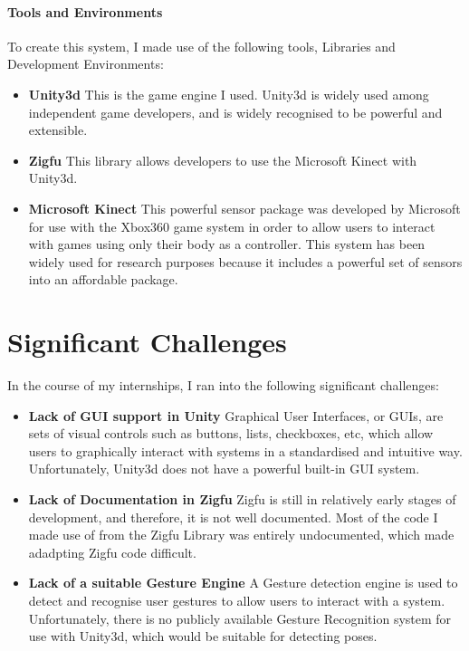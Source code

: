 \documentclass{report}
\begin{document}
\paragraph{Tools and Environments}
To create this system, I made use of the following tools, Libraries and Development Environments:
\begin{itemize}
	\item \textbf{Unity3d} This is the game engine I used. Unity3d is widely used among independent game developers, and is widely recognised to be powerful and extensible.

	\item \textbf{Zigfu} This library allows developers to use the Microsoft Kinect with Unity3d. 

	\item \textbf{Microsoft Kinect} This powerful sensor package was developed by Microsoft for use with the Xbox360 game system in order to allow users to interact with games using only their body as a controller. This system has been widely used for research purposes because it includes a powerful set of sensors into an affordable package.
\end{itemize}

\section{Significant Challenges}
In the course of my internships, I ran into the following significant challenges:
\begin{itemize}
	\item \textbf{Lack of GUI support in Unity} Graphical User Interfaces, or GUIs, are sets of visual controls such as buttons, lists, checkboxes, etc, which allow users to graphically interact with systems in a standardised and intuitive way. Unfortunately, Unity3d does not have a powerful built-in GUI system. 

	\item \textbf{Lack of Documentation in Zigfu} Zigfu is still in relatively early stages of development, and therefore, it is not well documented. Most of the code I made use of from the Zigfu Library was entirely undocumented, which made adadpting Zigfu code difficult.

	\item \textbf{Lack of a suitable Gesture Engine} A Gesture detection engine is used to detect and recognise user gestures to allow users to interact with a system. Unfortunately, there is no publicly available Gesture Recognition system for use with Unity3d, which would be suitable for detecting poses. 
\end{itemize} 
\end{document}
